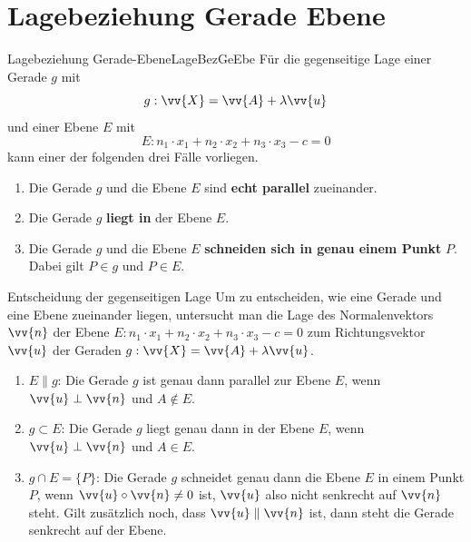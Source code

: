 \section{Lagebeziehung Gerade Ebene}
\begin{defi}{Lagebeziehung Gerade-Ebene}{LageBezGeEbe}
    Für die gegenseitige Lage einer Gerade \(g\) mit \[g: \vv{X} = \vv{A} + \lambda \vv{u}\] und einer Ebene \(E\) mit \[E: n_1\cdot x_1 + n_2\cdot x_2 +n_3\cdot x_3 -c = 0\] kann einer der folgenden drei Fälle vorliegen.
    \begin{enumerate}
        \item Die Gerade \(g\) und die Ebene \(E\) sind \textbf{echt parallel} zueinander.
        \item Die Gerade \(g\) \textbf{liegt in} der Ebene \(E\).
        \item Die Gerade \(g\) und die Ebene \(E\) \textbf{schneiden sich in genau einem Punkt} \(P\). Dabei gilt \(P \in g\) und \(P\in E\).
     \end{enumerate}
\end{defi}
\begin{satz}{Entscheidung der gegenseitigen Lage}{}
 Um zu entscheiden, wie eine Gerade und eine Ebene zueinander liegen, untersucht man die Lage des Normalenvektors \(\vv{n}\) der Ebene \(E: n_1\cdot x_1 + n_2\cdot x_2 +n_3\cdot x_3 -c = 0\) zum Richtungsvektor \(\vv{u}\) der Geraden \(g:\vv{X} = \vv{A} + \lambda \vv{u}\).
 \begin{enumerate}
     \item \(E \parallel g\): Die Gerade \(g\) ist genau dann parallel zur Ebene \(E\), wenn \(\vv{u} \perp \vv{n}\) und \(A\notin E\). 
     \item \(g\subset E\): Die Gerade \(g\) liegt genau dann in der Ebene \(E\), wenn \(\vv{u} \perp \vv{n}\) und \(A\in E\).
    \item \(g\cap E = \{P\}\): Die Gerade \(g\) schneidet genau dann die Ebene \(E\) in einem Punkt \(P\), wenn \(\vv{u}\circ \vv{n} \neq 0\) ist, \(\vv{u}\) also nicht senkrecht auf \(\vv{n}\) steht. Gilt zusätzlich noch, dass \(\vv{u}\parallel \vv{n}\) ist, dann steht die Gerade senkrecht auf der Ebene. 
 \end{enumerate}
\end{satz}
